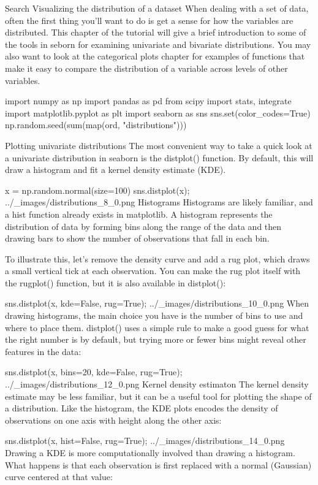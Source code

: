 
Search
Visualizing the distribution of a dataset
When dealing with a set of data, often the first thing you’ll want to do is get a sense for how the variables are distributed. This chapter of the tutorial will give a brief introduction to some of the tools in seborn for examining univariate and bivariate distributions. You may also want to look at the categorical plots chapter for examples of functions that make it easy to compare the distribution of a variable across levels of other variables.

import numpy as np
import pandas as pd
from scipy import stats, integrate
import matplotlib.pyplot as plt
import seaborn as sns
sns.set(color_codes=True)
np.random.seed(sum(map(ord, "distributions")))


Plotting univariate distributions
The most convenient way to take a quick look at a univariate distribution in seaborn is the distplot() function. By default, this will draw a histogram and fit a kernel density estimate (KDE).

x = np.random.normal(size=100)
sns.distplot(x);
../_images/distributions_8_0.png
Histograms
Histograms are likely familiar, and a hist function already exists in matplotlib. A histogram represents the distribution of data by forming bins along the range of the data and then drawing bars to show the number of observations that fall in each bin.

To illustrate this, let’s remove the density curve and add a rug plot, which draws a small vertical tick at each observation. You can make the rug plot itself with the rugplot() function, but it is also available in distplot():

sns.distplot(x, kde=False, rug=True);
../_images/distributions_10_0.png
When drawing histograms, the main choice you have is the number of bins to use and where to place them. distplot() uses a simple rule to make a good guess for what the right number is by default, but trying more or fewer bins might reveal other features in the data:

sns.distplot(x, bins=20, kde=False, rug=True);
../_images/distributions_12_0.png
Kernel density estimaton
The kernel density estimate may be less familiar, but it can be a useful tool for plotting the shape of a distribution. Like the histogram, the KDE plots encodes the density of observations on one axis with height along the other axis:

sns.distplot(x, hist=False, rug=True);
../_images/distributions_14_0.png
Drawing a KDE is more computationally involved than drawing a histogram. What happens is that each observation is first replaced with a normal (Gaussian) curve centered at that value:

